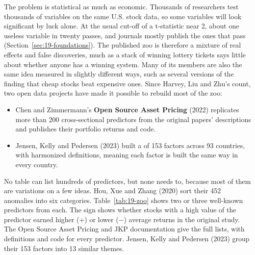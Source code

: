 The problem is statistical as much as economic. Thousands of researchers test thousands of variables on the same U.S. stock data, so some variables will look significant by luck alone. At the usual cut-off of a t-statistic near 2, about one useless variable in twenty passes, and journals mostly publish the ones that pass (Section~\ref{sec:19-foundations}). The published zoo is therefore a mixture of real effects and false discoveries, much as a stack of winning lottery tickets says little about whether anyone has a winning system. Many of its members are also the same idea measured in slightly different ways, such as several versions of the finding that cheap stocks beat expensive ones. Since Harvey, Liu and Zhu's count, two open data projects have made it possible to rebuild most of the zoo:

\begin{itemize}
  \item Chen and Zimmermann's \textbf{Open Source Asset Pricing} (2022) replicates more than 200 cross-sectional predictors from the original papers' descriptions and publishes their portfolio returns and code.
  \item Jensen, Kelly and Pedersen (2023) built a  of 153 factors across 93 countries, with harmonized definitions, meaning each factor is built the same way in every country.
\end{itemize}

No table can list hundreds of predictors, but none needs to, because most of them are variations on a few ideas. Hou, Xue and Zhang (2020) sort their 452 anomalies into six categories. Table~\ref{tab:19-zoo} shows two or three well-known predictors from each. The sign shows whether stocks with a high value of the predictor earned higher (+) or lower ($-$) average returns in the original study. The Open Source Asset Pricing and JKP documentation give the full lists, with definitions and code for every predictor. Jensen, Kelly and Pedersen (2023) group their 153 factors into 13 similar themes.

\begingroup
\small


